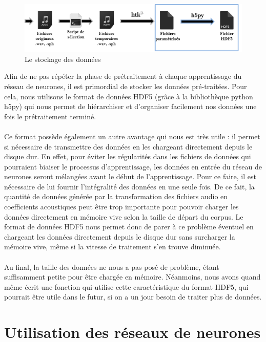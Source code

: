 \documentclass{article}
\begin{document}
\hphantom{.}
\begin{figure}[h]
  \centerline{\includegraphics[scale=0.9]{img/schema_stockage.png}}
  \caption{Le stockage des données}
\end{figure}

Afin de ne pas répéter la phase de prétraitement à chaque apprentissage du réseau de neurones, il est primordial de stocker les données pré-traitées. Pour cela, nous utilisons le format de données HDF5\cite{docHDF5} (grâce à la bibliothèque python h5py\cite{docH5py}) qui nous permet de hiérarchiser et d'organiser facilement nos données une fois le prétraitement terminé.\\
 \\
 Ce format possède également un autre avantage qui nous est très utile : il permet si nécessaire de transmettre des données en les chargeant directement depuis le disque dur. En effet, pour éviter les régularités dans les fichiers de données qui pourraient biaiser le processus d'apprentissage, les données en entrée du réseau de neurones seront mélangées avant le début de l'apprentissage. Pour ce faire, il est nécessaire de lui fournir l'intégralité des données en une seule fois. De ce fait, la quantité de données générée par la transformation des fichiers audio en coefficients acoustiques peut être trop importante pour pouvoir charger les données directement en mémoire vive selon la taille de départ du corpus. Le format de données HDF5 nous permet donc de parer à ce problème éventuel en chargeant les données directement depuis le disque dur sans surcharger la mémoire vive, même si la vitesse de traitement s'en trouve diminuée.\\
 \\
Au final, la taille des données ne nous a pas posé de problème, étant suffisamment petite pour être chargée en mémoire. Néanmoins, nous avons quand même écrit une fonction qui utilise cette caractéristique du format HDF5, qui pourrait être utile dans le futur, si on a un jour besoin de traiter plus de données.

\section{Utilisation des réseaux de neurones}
\end{document}
